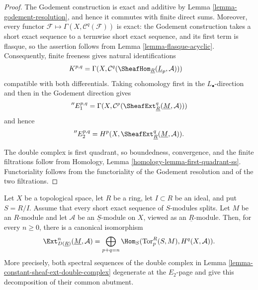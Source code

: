 \begin{proof}
The Godement construction is exact and additive by
Lemma \ref{lemma-godement-resolution}, and hence it commutes with finite
direct sums. Moreover, every functor
$\mathcal{F} \mapsto \Gamma(X, \mathcal{C}^q(\mathcal{F}))$ is exact:
the Godement construction takes a short exact sequence to a termwise
short exact sequence, and its first term is flasque, so the assertion
follows from Lemma \ref{lemma-flasque-acyclic}. Consequently, finite
freeness gives natural identifications
$$
\begin{aligned}
K^{p, q}
& = \Gamma(X,
\mathcal{C}^q(\SheafHom_{\underline{R}}
(\underline{L}_p, \mathcal{A})))
\end{aligned}
$$
compatible with both differentials. Taking cohomology first in the
$L_\bullet$-direction and then in the Godement direction gives
$$
{}''E_1^{p, q} =
\Gamma(X, \mathcal{C}^p(
\SheafExt^q_{\underline{R}}(\underline{M}, \mathcal{A})))
$$
and hence
$$
{}''E_2^{p, q} =
H^p(X, \SheafExt^q_{\underline{R}}(\underline{M}, \mathcal{A})).
$$

The double complex is first quadrant, so boundedness, convergence, and
the finite filtrations follow from Homology, Lemma
\ref{homology-lemma-first-quadrant-ss}. Functoriality follows from the
functoriality of the Godement resolution and of the two filtrations.
\end{proof}


\begin{lemma}
\label{lemma-constant-sheaf-ext-semisimple-quotient}
\begin{reference}
\cite[Chapter IV, \S 4.3, Corollary 1 to Proposition 4.3.2,
p. 192]{Tohoku}
\end{reference}
Let $X$ be a topological space, let $R$ be a ring, let $I \subset R$ be
an ideal, and put $S = R/I$. Assume that every short exact sequence of
$S$-modules splits. Let $M$ be an $R$-module and let $\mathcal{A}$ be an
$\underline{S}$-module on $X$, viewed as an $\underline{R}$-module. Then,
for every $n \geq 0$, there is a canonical isomorphism
$$
\Ext^n_{D(\underline{R})}(\underline{M}, \mathcal{A}) =
\bigoplus_{p + q = n}
\Hom_S(\text{Tor}_p^R(S, M), H^q(X, \mathcal{A})).
$$
More precisely, both spectral sequences of the double complex in
Lemma \ref{lemma-constant-sheaf-ext-double-complex} degenerate at the
$E_2$-page and give this decomposition of their common abutment.
\end{lemma}

